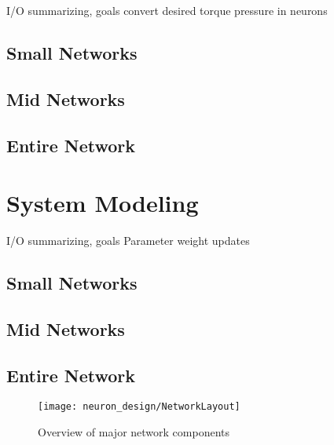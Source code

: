 I/O summarizing, goals
convert desired torque pressure in neurons

\subsection{Small Networks}


\subsection{Mid Networks}


\subsection{Entire Network}


\section{System Modeling}

I/O summarizing, goals
Parameter weight updates

\subsection{Small Networks}


\subsection{Mid Networks}


\subsection{Entire Network}



\begin{figure}[h!]
\centering
\texttt{[image: neuron\_design/NetworkLayout]}
\caption{Overview of major network components}
\label{fig:NetworkLayout}
\end{figure}
